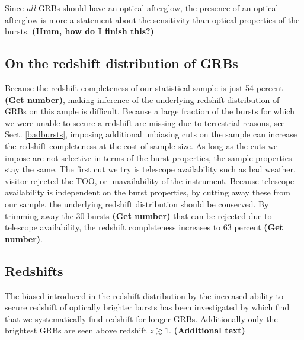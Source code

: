 \documentclass{aa}    %
\newcommand\todo[1]{\textbf{(#1)}}
\begin{document}
Since \textit{all} GRBs should have an optical afterglow, the presence of an optical afterglow is more a statement about the sensitivity than optical properties of the bursts. \todo{Hmm, how do I finish this?}


\subsection{On the redshift distribution of GRBs}

Because the redshift completeness of our statistical sample is just 54 percent
\todo{Get number}, making inference of the underlying redshift distribution of
GRBs on this ample is difficult. Because a large fraction of the bursts for which we were
unable to secure a redshift are missing due to terrestrial reasons, see Sect.
\ref{badbursts}, imposing additional unbiasing cuts on the sample can increase
the redshift completeness at the cost of sample size. As long as the cuts we
impose are not selective in terms of the burst properties, the sample properties
stay the same. The first cut we try is telescope availability such as bad
weather, visitor rejected the TOO, or unavailability of the instrument. Because
telescope availability is independent on the burst properties, by cutting away
these from our sample, the underlying redshift distribution should be conserved.
By trimming away the 30 bursts \todo{Get number} that can be rejected due to
telescope availability, the redshift completeness increases to 63 percent
\todo{Get number}. 


\subsection{Redshifts}

The biased introduced in the redshift distribution by the increased ability to
secure redshift of optically brighter bursts has been investigated by
\citet{Turpin2016} which find that we systematically find redshift for longer
GRBs. Additionally only the brightest GRBs are seen above redshift $z \gtrsim
1$. \todo{Additional text}
\end{document}

